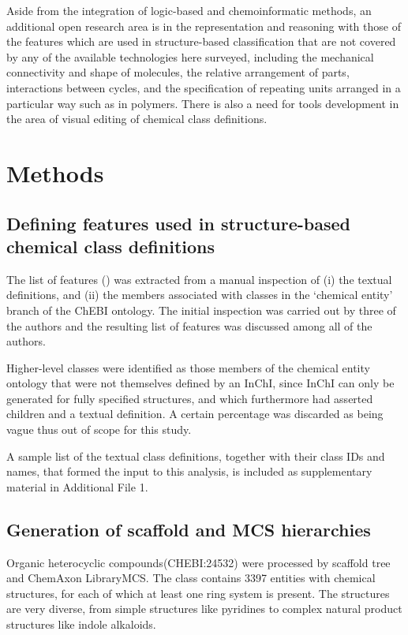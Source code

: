 \documentclass[10pt]{bmc_article}
\newenvironment{bmcformat}{\baselineskip20pt\sloppy\setboolean{publ}{false}}{\baselineskip20pt\sloppy}
\begin{document}
\begin{bmcformat}
Aside from the integration of logic-based and chemoinformatic methods, an additional open research area is in the representation and reasoning with those of the features which are used in structure-based classification that are not covered by any of the available technologies here surveyed, including the mechanical connectivity and shape of molecules, the relative arrangement of parts, interactions between cycles, and the specification of repeating units arranged in a particular way such as in polymers. There is also a need for tools development in the area of visual editing of chemical class definitions. 


\section*{Methods}

\subsection*{Defining features used in structure-based chemical class definitions}

The list of features () was extracted from a manual inspection of (i) the textual definitions, and (ii) the members associated with classes in the `chemical entity' branch of the ChEBI ontology. The initial inspection was carried out by three of the authors and the resulting list of features was discussed among all of the authors. 

Higher-level classes were identified as those members of the chemical entity ontology that were not themselves defined by an InChI, since InChI can only be generated for fully specified structures, and which furthermore had asserted children and a textual definition.  A certain percentage was discarded as being vague thus out of scope for this study. 

A sample list of the textual class definitions, together with their class IDs and names, that formed the input to this analysis, is included as supplementary material in Additional File 1. %


\subsection*{Generation of scaffold and MCS hierarchies}

Organic heterocyclic compounds(CHEBI:24532) were processed by scaffold tree and ChemAxon LibraryMCS. The class contains 3397 entities with chemical structures, for each of which at least one ring system is present. The structures are very diverse, from simple structures like pyridines to complex natural product structures like indole alkaloids. 


\end{bmcformat}
\end{document}
